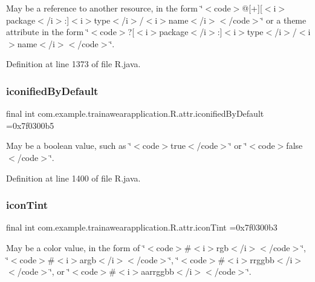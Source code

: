 May be a reference to another resource, in the form \char`\"{}$<$code$>$@\mbox{[}+\mbox{]}\mbox{[}$<$i$>$package$<$/i$>$\+:\mbox{]}$<$i$>$type$<$/i$>$/$<$i$>$name$<$/i$>$$<$/code$>$\char`\"{} or a theme attribute in the form \char`\"{}$<$code$>$?\mbox{[}$<$i$>$package$<$/i$>$\+:\mbox{]}$<$i$>$type$<$/i$>$/$<$i$>$name$<$/i$>$$<$/code$>$\char`\"{}. 

Definition at line 1373 of file R.\+java.

\mbox{\label{classcom_1_1example_1_1trainawearapplication_1_1_r_1_1attr_a3d83fa912aa70602848f28d8ff0f2a5d}} 
\subsubsection{\texorpdfstring{iconifiedByDefault}{iconifiedByDefault}}
{\footnotesize\ttfamily final int com.\+example.\+trainawearapplication.\+R.\+attr.\+iconified\+By\+Default =0x7f0300b5\hspace{0.3cm}{\ttfamily [static]}}

May be a boolean value, such as \char`\"{}$<$code$>$true$<$/code$>$\char`\"{} or \char`\"{}$<$code$>$false$<$/code$>$\char`\"{}. 

Definition at line 1400 of file R.\+java.

\mbox{\label{classcom_1_1example_1_1trainawearapplication_1_1_r_1_1attr_a4bcaacb0344b22eca81c6fde6f19184a}} 
\subsubsection{\texorpdfstring{iconTint}{iconTint}}
{\footnotesize\ttfamily final int com.\+example.\+trainawearapplication.\+R.\+attr.\+icon\+Tint =0x7f0300b3\hspace{0.3cm}{\ttfamily [static]}}

May be a color value, in the form of \char`\"{}$<$code$>$\#$<$i$>$rgb$<$/i$>$$<$/code$>$\char`\"{}, \char`\"{}$<$code$>$\#$<$i$>$argb$<$/i$>$$<$/code$>$\char`\"{}, \char`\"{}$<$code$>$\#$<$i$>$rrggbb$<$/i$>$$<$/code$>$\char`\"{}, or \char`\"{}$<$code$>$\#$<$i$>$aarrggbb$<$/i$>$$<$/code$>$\char`\"{}. 

